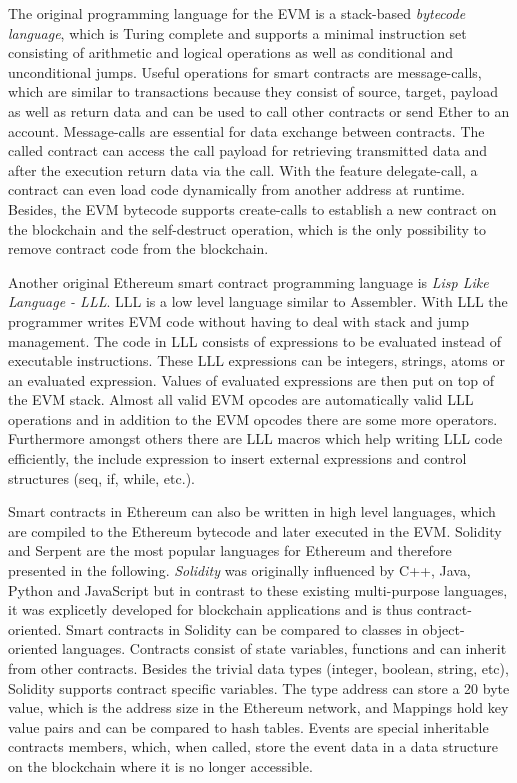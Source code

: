 \documentclass[conference]{IEEEtran}
\begin{document}
The original programming language for the EVM is a stack-based \textit{bytecode language}, which is Turing complete and supports a minimal instruction set consisting of arithmetic and logical operations as well as conditional and unconditional jumps. Useful operations for smart contracts are message-calls, which are similar to transactions because they consist of source, target, payload as well as return data and can be used to call other contracts or send Ether to an account. Message-calls are essential for data exchange between contracts. The called contract can access the call payload for retrieving transmitted data and after the execution return data via the call. With the feature delegate-call, a contract can even load code dynamically from another address at runtime. Besides, the EVM bytecode supports create-calls to establish a new contract on the blockchain and the self-destruct operation, which is the only possibility to remove contract code from the blockchain. \cite{Bartoletti2017} \cite{McAdams2017} \cite{Solidity2017}\par 
Another original Ethereum smart contract programming language is \textit{Lisp Like Language - LLL}. LLL is a low level language similar to Assembler. With LLL the programmer writes EVM code without having to deal with stack and jump management. The code in LLL consists of expressions to be evaluated instead of executable instructions. These LLL expressions can be integers, strings, atoms or an evaluated expression. Values of evaluated expressions are then put on top of the EVM stack. Almost all valid EVM opcodes are automatically valid LLL operations and in addition to the EVM opcodes there are some more operators. Furthermore amongst others there are LLL macros which help writing LLL code efficiently, the include expression to insert external expressions and control structures (seq, if, while, etc.). \cite{Edgington2017} \par 
Smart contracts in Ethereum can also be written in high level languages, which are compiled to the Ethereum bytecode and later executed in the EVM. Solidity and Serpent are the most popular languages for Ethereum and therefore presented in the following. \textit{Solidity} was originally influenced by C++, Java, Python and JavaScript but in contrast to these existing multi-purpose languages, it was explicetly developed for blockchain applications and is thus contract-oriented. Smart contracts in Solidity can be compared to classes in object-oriented languages. Contracts consist of state variables, functions and can inherit from other contracts. Besides the trivial data types (integer, boolean, string, etc), Solidity supports contract specific variables. The type address can store a 20 byte value, which is the address size in the Ethereum network, and Mappings hold key value pairs and can be compared to hash tables. Events are special inheritable contracts members, which, when called, store the event data in a data structure on the blockchain where it is no longer accessible. \cite{McAdams2017} \cite{Solidity2017}\par 
\end{document}
